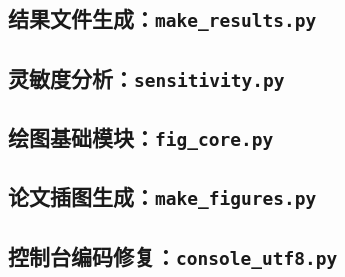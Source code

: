 \documentclass[bwprint]{cumcmthesis}
\begin{document}
\subsection{结果文件生成：\texttt{make\_results.py}}


\subsection{灵敏度分析：\texttt{sensitivity.py}}


\subsection{绘图基础模块：\texttt{fig\_core.py}}


\subsection{论文插图生成：\texttt{make\_figures.py}}


\subsection{控制台编码修复：\texttt{console\_utf8.py}}

\end{document}
